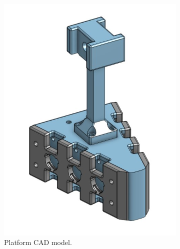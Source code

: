 \begin{figure}[ht]
    \centering
    \begin{subfigure}[b]{0.45\textwidth}
        \centering
        \includegraphics[width=\linewidth]{figures/platform-cad}
        \caption{Platform CAD model.}
    \end{subfigure}
    \hfill
    \begin{subfigure}[b]{0.45\textwidth}
        \centering

\end{subfigure}
\end{figure}
